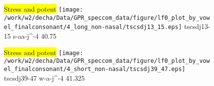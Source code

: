 \documentclass{article}
\begin{document}
\begin{figure}[t]
\begin{minipage}[b]{.24\textwidth}
\colorbox{yellow}{Stress and potent}
\centering
\texttt{[image: /work/w2/decha/Data/GPR\_speccom\_data/figure/lf0\_plot\_by\_vowel\_finalconsonant/4\_long\_non-nasal/tscsdj13\_15.eps]}
tscsdj13-15 s-aa-j\textasciicircum-4 40.75
\end{minipage}
\begin{minipage}[b]{.24\textwidth}
\colorbox{yellow}{Stress and potent}
\centering
\texttt{[image: /work/w2/decha/Data/GPR\_speccom\_data/figure/lf0\_plot\_by\_vowel\_finalconsonant/4\_short\_non-nasal/tscsdj39\_47.eps]}
tscsdj39-47 w-a-j\textasciicircum-4 41.325
\end{minipage}
\end{figure}
\end{document}
